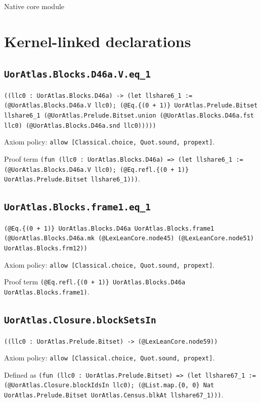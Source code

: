 \documentclass[11pt]{article}
\begin{document}
\begin{center}{\LARGE Native core module}\end{center}
\section*{Kernel-linked declarations}
\subsection*{\texttt{UorAtlas.Blocks.D46a.V.eq\_1}}
\noindent\texttt{((llc0 : UorAtlas.Blocks.D46a) -> (let llshare6\_1 := (@UorAtlas.Blocks.D46a.V llc0); (@Eq.\{(0 + 1)\} UorAtlas.Prelude.Bitset llshare6\_1 (@UorAtlas.Prelude.Bitset.union (@UorAtlas.Blocks.D46a.fst llc0) (@UorAtlas.Blocks.D46a.snd llc0)))))}\par
\noindent Axiom policy: \texttt{allow [Classical.choice, Quot.sound, propext]}.\par
\noindent Proof term \texttt{(fun (llc0 : UorAtlas.Blocks.D46a) => (let llshare6\_1 := (@UorAtlas.Blocks.D46a.V llc0); (@Eq.refl.\{(0 + 1)\} UorAtlas.Prelude.Bitset llshare6\_1)))}.\par
\subsection*{\texttt{UorAtlas.Blocks.frame1.eq\_1}}
\noindent\texttt{(@Eq.\{(0 + 1)\} UorAtlas.Blocks.D46a UorAtlas.Blocks.frame1 (@UorAtlas.Blocks.D46a.mk (@LexLeanCore.node45) (@LexLeanCore.node51) UorAtlas.Blocks.frm12))}\par
\noindent Axiom policy: \texttt{allow [Classical.choice, Quot.sound, propext]}.\par
\noindent Proof term \texttt{(@Eq.refl.\{(0 + 1)\} UorAtlas.Blocks.D46a UorAtlas.Blocks.frame1)}.\par
\subsection*{\texttt{UorAtlas.Closure.blockSetsIn}}
\noindent\texttt{((llc0 : UorAtlas.Prelude.Bitset) -> (@LexLeanCore.node59))}\par
\noindent Axiom policy: \texttt{allow [Classical.choice, Quot.sound, propext]}.\par
\noindent Defined as \texttt{(fun (llc0 : UorAtlas.Prelude.Bitset) => (let llshare67\_1 := (@UorAtlas.Closure.blockIdsIn llc0); (@List.map.\{0, 0\} Nat UorAtlas.Prelude.Bitset UorAtlas.Census.blkAt llshare67\_1)))}.\par
\end{document}
